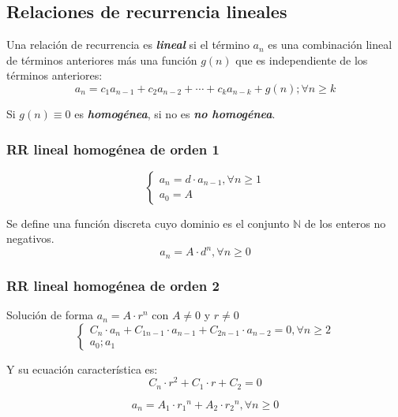 \documentclass[11pt,a4paper]{article}   %
\newcommand{\N}{\mathbb{N}}              %
\begin{document}
\subsection{Relaciones de recurrencia lineales}
Una relación de recurrencia es \textit{\textbf{lineal}} si el término $a_n$ es una combinación lineal de términos anteriores más una función $g(n)$ que es independiente de los términos anteriores:
\[
a_n = c_1 a_{n-1} + c_2 a_{n-2} + \cdots + c_k a_{n-k} + g(n); \forall n \geqslant k
\]

\begin{tcolorbox}[colback=yellow!5!white,colframe=yellow!75!black,title=Tipos de recurrencias]
Si $g(n) \equiv 0 $ es \textit{\textbf{homogénea}}, si no es \textit{\textbf{no homogénea}}.
\end{tcolorbox}

\subsubsection{RR lineal homogénea de orden 1}
\[
\begin{cases}
a_n = d \cdot a_{n-1}, \forall n \geqslant 1 \\
a_0 = A
\end{cases}
\]

\begin{tcolorbox}[colback=purple!5!white,colframe=purple!75!black,title=Solución]
Se define una función discreta cuyo dominio es el conjunto $\N$ de los enteros no negativos.
\[
a_n = A \cdot d^n, \forall n \geqslant 0
\]
\end{tcolorbox}

\subsubsection{RR lineal homogénea de orden 2}
Solución de forma $a_n = A \cdot r^n$ con $A \neq 0$ y $r \neq 0$
\[
\begin{cases}
C_n \cdot a_n + C_{1{n-1}} \cdot a_{n-1} + C_{2{n-1}} \cdot a_{n-2} = 0, \forall n \geqslant 2 \\
a_0; a_1
\end{cases}
\]

Y su ecuación característica es:
\[
C_n \cdot r^2 + C_1 \cdot r + C_2 = 0
\]

\begin{tcolorbox}[colback=purple!5!white,colframe=purple!75!black,title=Caso 1: Raíces reales y distintas]
\[
a_n = A_1 \cdot {r_1}^n + A_2 \cdot {r_2}^n, \forall n \geqslant 0
\]
\end{tcolorbox}
\end{document}
